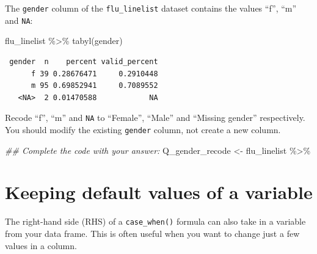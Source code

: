 \documentclass[
  letterpaper,
  DIV=11,
  numbers=noendperiod]{scrreprt}
\newenvironment{Shaded}{\begin{snugshade}}{\end{snugshade}}
\newcommand{\DocumentationTok}[1]{\textcolor[rgb]{0.37,0.37,0.37}{\textit{#1}}}
\newcommand{\FunctionTok}[1]{\textcolor[rgb]{0.28,0.35,0.67}{#1}}
\newcommand{\NormalTok}[1]{\textcolor[rgb]{0.00,0.23,0.31}{#1}}
\newcommand{\OtherTok}[1]{\textcolor[rgb]{0.00,0.23,0.31}{#1}}
\newcommand{\SpecialCharTok}[1]{\textcolor[rgb]{0.37,0.37,0.37}{#1}}
\begin{document}
\begin{tcolorbox}[enhanced jigsaw, titlerule=0mm, colback=white, left=2mm, breakable, opacitybacktitle=0.6, colbacktitle=quarto-callout-tip-color!10!white, colframe=quarto-callout-tip-color-frame, bottomtitle=1mm, opacityback=0, coltitle=black, arc=.35mm, toptitle=1mm, title=\textcolor{quarto-callout-tip-color}{\faLightbulb}\hspace{0.5em}{Practice}, leftrule=.75mm, toprule=.15mm, bottomrule=.15mm, rightrule=.15mm]

The \texttt{gender} column of the \texttt{flu\_linelist} dataset
contains the values ``f'', ``m'' and \texttt{NA}:

\begin{Shaded}
\begin{Highlighting}[]
\NormalTok{flu\_linelist }\SpecialCharTok{\%\textgreater{}\%} 
  \FunctionTok{tabyl}\NormalTok{(gender)}
\end{Highlighting}
\end{Shaded}

\begin{verbatim}
 gender  n    percent valid_percent
      f 39 0.28676471     0.2910448
      m 95 0.69852941     0.7089552
   <NA>  2 0.01470588            NA
\end{verbatim}

Recode ``f'', ``m'' and \texttt{NA} to ``Female'', ``Male'' and
``Missing gender'' respectively. You should modify the existing
\texttt{gender} column, not create a new column.

\begin{Shaded}
\begin{Highlighting}[]
\DocumentationTok{\#\# Complete the code with your answer:}
\NormalTok{Q\_gender\_recode }\OtherTok{\textless{}{-}} 
\NormalTok{  flu\_linelist }\SpecialCharTok{\%\textgreater{}\%} 
\end{Highlighting}
\end{Shaded}

\end{tcolorbox}

\section{Keeping default values of a
variable}\label{keeping-default-values-of-a-variable}

The right-hand side (RHS) of a \texttt{case\_when()} formula can also
take in a variable from your data frame. This is often useful when you
want to change just a few values in a column.
\end{document}
